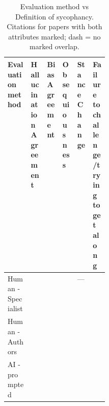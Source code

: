 \begin{table}[!htbp]
\centering
\small
\setlength{\tabcolsep}{4pt}
\renewcommand{\arraystretch}{1.3}
\caption{Evaluation method vs Definition of sycophancy. Citations for papers with both attributes marked; dash = no marked overlap.}
\begin{tabularx}{\linewidth}{|>{\raggedright\arraybackslash}p{0.23\linewidth}|>{\centering\arraybackslash}X|>{\centering\arraybackslash}X|>{\centering\arraybackslash}X|>{\centering\arraybackslash}X|>{\centering\arraybackslash}X|}
\hline
\textbf{Evaluation method} & \textbf{\hspace{0pt}Hallucination Agreement} & \textbf{\hspace{0pt}Bias Agreement} & \textbf{\hspace{0pt}Obsequiousness} & \textbf{\hspace{0pt}Stance Change} & \textbf{\hspace{0pt}Failure to challenge/trying to get along} \\ \hline
Human - Specialist & \cite{10.1145/3703155} & \cite{10.1145/3772318.3791233} \cite{10.1145/3772318.3791300} & \cite{10.1145/3660650.3660656} & --- & \cite{10.1145/3660650.3660656} \cite{10.1145/3703155} \cite{10.1145/3715275.3732039} \\ \hline
Human - Authors & \cite{10.1109/SCW63240.2024.00017} \cite{10.1145/3746027.3755778} & \cite{10.1145/3776734.3794532} \cite{10.1145/3786304.3787879} & \cite{10.1145/3744169.3744194} \cite{10.1145/3776734.3794532} & \cite{10.1145/3746027.3755778} \cite{10.1145/3786335.3813137} & \cite{10.1145/3663547.3746319} \cite{10.1145/3744169.3744194} \cite{10.1145/3772363.3799334} \cite{10.1145/3776734.3794532} \\ \hline
AI - prompted & \cite{10.1109/ICASSP55912.2026.11460702} \cite{10.1109/SCW63240.2024.00017} & \cite{10.1145/3774904.3792506} \cite{10.1145/3788646.3789536} & \cite{10.1109/AIxVR67263.2026.00026} & \cite{10.1109/BigData62323.2024.10825538} \cite{10.1109/ICASSP55912.2026.11460702} \cite{10.1145/3774904.3792506} & \cite{10.1109/AIxVR67263.2026.00026} \cite{10.1109/BigData62323.2024.10825538} \cite{10.1109/ICASSP55912.2026.11460702} \cite{10.1145/3715275.3732039} \cite{10.1145/3742413.3789120} \cite{10.1145/3788646.3789536} \\ \hline
\end{tabularx}
\end{table}
